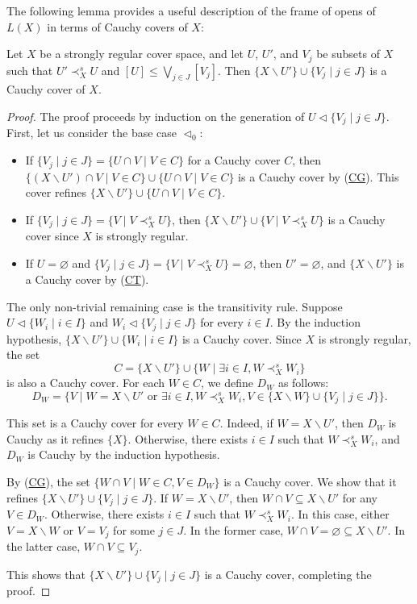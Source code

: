 \documentclass[pdflatex,sn-mathphys-num]{sn-jnl}
\newcommand{\axref}[1]{(\hyperref[ax:#1]{#1})}
\theoremstyle{definition}
\theoremstyle{remark}
\numberwithin{figure}{section}
\newcommand{\rb}{\prec}
\begin{document}
The following lemma provides a useful description of the frame of opens of $L(X)$ in terms of Cauchy covers of $X$:

\begin{lem}
Let $X$ be a strongly regular cover space, and let $U$, $U'$, and $V_j$ be subsets of $X$ such that $U' \rb^s_X U$ and $[U] \leq \bigvee_{j \in J} [V_j]$.
Then $\{ X \backslash U' \} \cup \{ V_j \mid j \in J \}$ is a Cauchy cover of $X$.
\end{lem}
\begin{proof}
The proof proceeds by induction on the generation of $U \triangleleft \{ V_j \mid j \in J \}$.
First, let us consider the base case $\triangleleft_0$:
\begin{itemize}
\item If $\{ V_j \mid j \in J \} = \{ U \cap V \mid V \in C \}$ for a Cauchy cover $C$, then $\{ (X \backslash U') \cap V \mid V \in C \} \cup \{ U \cap V \mid V \in C \}$ is a Cauchy cover by \axref{CG}.
        This cover refines $\{ X \backslash U' \} \cup \{ U \cap V \mid V \in C \}$.
\item If $\{ V_j \mid j \in J \} = \{ V \mid V \rb^s_X U \}$, then $\{ X \backslash U' \} \cup \{ V \mid V \rb^s_X U \}$ is a Cauchy cover since $X$ is strongly regular.
\item If $U = \varnothing$ and $\{ V_j \mid j \in J \} = \{ V \mid V \rb^s_X U \} = \varnothing$, then $U' = \varnothing$, and $\{ X \backslash U' \}$ is a Cauchy cover by \axref{CT}.
\end{itemize}

The only non-trivial remaining case is the transitivity rule.
Suppose $U \triangleleft \{ W_i \mid i \in I \}$ and $W_i \triangleleft \{ V_j \mid j \in J \}$ for every $i \in I$.
By the induction hypothesis, $\{ X \backslash U'\} \cup \{ W_i \mid i \in I \}$ is a Cauchy cover.
Since $X$ is strongly regular, the set
\[ C = \{ X \backslash U'\} \cup \{ W \mid \exists i \in I, W \rb^s_X W_i \} \]
is also a Cauchy cover.
For each $W \in C$, we define $D_W$ as follows:
\[ D_W = \{ V \mid W = X \backslash U' \textrm{ or } \exists i \in I, W \rb^s_X W_i, V \in \{ X \backslash W \} \cup \{ V_j \mid j \in J \} \}. \]

This set is a Cauchy cover for every $W \in C$.
Indeed, if $W = X \backslash U'$, then $D_W$ is Cauchy as it refines $\{ X \}$.
Otherwise, there exists $i \in I$ such that $W \rb^s_X W_i$, and $D_W$ is Cauchy by the induction hypothesis.

By \axref{CG}, the set $\{ W \cap V \mid W \in C, V \in D_W \}$ is a Cauchy cover.
We show that it refines $\{ X \backslash U'\} \cup \{ V_j \mid j \in J \}$.
If $W = X \backslash U'$, then $W \cap V \subseteq X \backslash U'$ for any $V \in D_W$.
Otherwise, there exists $i \in I$ such that $W \rb^s_X W_i$.
In this case, either $V = X \backslash W$ or $V = V_j$ for some $j \in J$.
In the former case, $W \cap V = \varnothing \subseteq X \backslash U'$.
In the latter case, $W \cap V \subseteq V_j$.

This shows that $\{ X \backslash U'\} \cup \{ V_j \mid j \in J \}$ is a Cauchy cover, completing the proof.
\end{proof}
\end{document}
